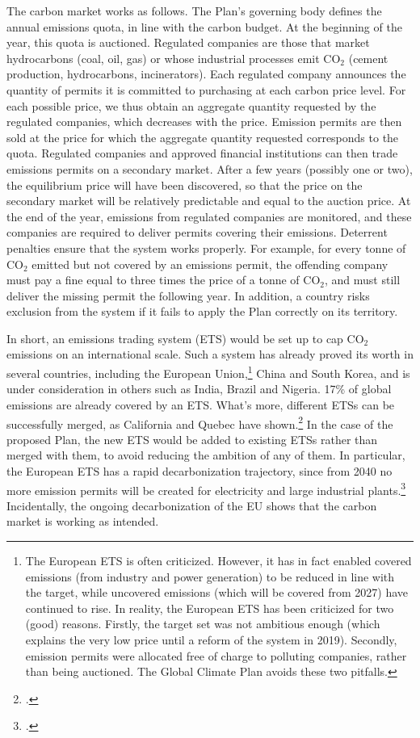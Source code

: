 \documentclass[a5paper,english,openany]{memoir}
\begin{document}
The carbon market works as follows. 
The Plan's governing body defines the annual emissions quota, in line with the carbon budget. At the beginning of the year, this quota is auctioned. %
Regulated companies are those that market hydrocarbons (coal, oil, gas) or whose industrial processes emit CO$_\text{2}$ (cement production, hydrocarbons, incinerators). 
Each regulated company announces the quantity of permits it is committed to purchasing at each carbon price level. For each possible price, we thus obtain an aggregate quantity requested by the regulated companies, which decreases with the price. Emission permits are then sold at the price for which the aggregate quantity requested corresponds to the quota. Regulated companies and approved financial institutions can then trade emissions permits on a secondary market. After a few years (possibly one or two), 
the equilibrium price will have been discovered, so that the price on the secondary market will be relatively predictable and equal to the auction price. At the end of the year, emissions from regulated companies are monitored, and these companies are required to deliver permits covering their emissions. %
Deterrent penalties ensure that the system works properly. For example, for every tonne of CO$_\text{2}$ emitted but not covered by an emissions permit, the offending company must pay a fine equal to three times the price of a tonne of CO$_\text{2}$, and must still deliver the missing permit the following year. In addition, a country risks exclusion from the system if it fails to apply the Plan correctly on its territory. %

In short, an emissions trading system (ETS) would be set up to cap CO$_\text{2}$ emissions on an international scale. 
Such a system has already proved its worth in several countries, including the European Union,\footnote{The European ETS is often criticized. However, it has in fact enabled covered emissions (from industry and power generation) to be reduced in line with the target, while uncovered emissions (which will be covered from 2027) have continued to rise. In reality, the European ETS has been criticized for two (good) reasons. Firstly, the target set was not ambitious enough (which explains the very low price until a reform of the system in 2019). Secondly, emission permits were allocated free of charge to polluting companies, rather than being auctioned. The Global Climate Plan avoids these two pitfalls.} 
China and South Korea, and is under consideration in others such as India, Brazil and Nigeria. 17\% of global emissions are already covered by an ETS. What's more, different ETSs can be successfully merged, as California and Quebec have shown.\footnote{\citet{icap_emissions_2023}.} In the case of the proposed Plan, the new ETS would be added to existing ETSs rather than merged with them, to avoid reducing the ambition of any of them. In particular, the European ETS has a rapid decarbonization trajectory, since from 2040 no more emission permits will be created for electricity and large industrial plants.\footnote{\citet{pahle_emerging_2023}.} Incidentally, the ongoing decarbonization of the EU shows that the carbon market is working as intended.
\end{document}
